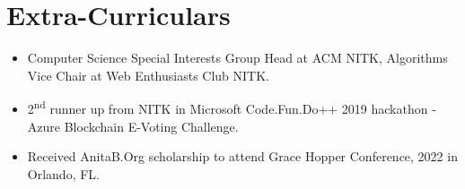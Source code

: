 \documentclass{article}
\begin{document}
\section{Extra-Curriculars}
\begin{itemize}
\item Computer Science Special Interests Group Head at ACM NITK, Algorithms Vice Chair at Web Enthusiasts Club NITK.
\item 2\textsuperscript{nd} runner up from NITK in Microsoft Code.Fun.Do++ 2019 hackathon - Azure Blockchain E-Voting Challenge.
\item Received AnitaB.Org scholarship to attend Grace Hopper Conference, 2022 in Orlando, FL.
\end{itemize}
\end{document}
